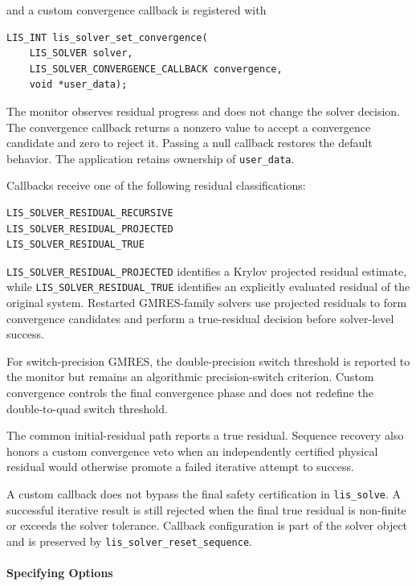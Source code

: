 \documentclass[a4paper]{article}
\begin{document}
and a custom convergence callback is registered with

\begin{verbatim}
LIS_INT lis_solver_set_convergence(
    LIS_SOLVER solver,
    LIS_SOLVER_CONVERGENCE_CALLBACK convergence,
    void *user_data);
\end{verbatim}

The monitor observes residual progress and does not change the solver
decision. The convergence callback returns a nonzero value to accept a
convergence candidate and zero to reject it. Passing a null callback
restores the default behavior. The application retains ownership of
\verb|user_data|.

Callbacks receive one of the following residual classifications:

\begin{verbatim}
LIS_SOLVER_RESIDUAL_RECURSIVE
LIS_SOLVER_RESIDUAL_PROJECTED
LIS_SOLVER_RESIDUAL_TRUE
\end{verbatim}

\verb|LIS_SOLVER_RESIDUAL_PROJECTED| identifies a Krylov projected
residual estimate, while \verb|LIS_SOLVER_RESIDUAL_TRUE| identifies an
explicitly evaluated residual of the original system. Restarted
GMRES-family solvers use projected residuals to form convergence
candidates and perform a true-residual decision before solver-level
success.

For switch-precision GMRES, the double-precision switch threshold is
reported to the monitor but remains an algorithmic precision-switch
criterion. Custom convergence controls the final convergence phase and
does not redefine the double-to-quad switch threshold.

The common initial-residual path reports a true residual. Sequence
recovery also honors a custom convergence veto when an independently
certified physical residual would otherwise promote a failed iterative
attempt to success.

A custom callback does not bypass the final safety certification in
\verb|lis_solve|. A successful iterative result is still rejected when
the final true residual is non-finite or exceeds the solver tolerance.
Callback configuration is part of the solver object and is preserved by
\verb|lis_solver_reset_sequence|.
\\ \\
\noindent
{\bf Specifying Options}
\end{document}
